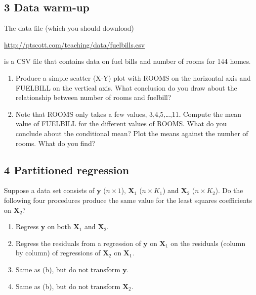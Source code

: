 \documentclass[11pt]{article}
\begin{document}
\subsection*{3 Data warm-up}

The data file (which you should download) 

\href{http://ptscott.com/teaching/data/fuelbills.csv}{http://ptscott.com/teaching/data/fuelbills.csv }

is a CSV file that contains data on fuel bills and number of rooms for 144 homes. 

\begin{enumerate}[label=\alph*)]
\item Produce a simple scatter (X-Y) plot with ROOMS on the horizontal axis
and FUELBILL on the vertical axis. What conclusion do you draw about
the relationship between number of rooms and fuelbill? 

\item Note that ROOMS only takes a few values, 3,4,5,\dots ,11. Compute
the mean value of FUELBILL for the different values of ROOMS. What
do you conclude about the conditional mean? Plot the means against
the number of rooms. What do you find?
\end{enumerate}



\subsection*{4 Partitioned regression}
Suppose a data set consists of $\boldsymbol{y}$ ($n \times 1$), $\boldsymbol{X}_{1}$ ($n \times K_{1}$)
and $\boldsymbol{X}_{2}$  ($n \times K_{2}$). Do the following four procedures
produce the same value for the least squares coefficients on $\boldsymbol{X}_{2}$?
\begin{enumerate}[label=\alph*)]
\item Regress $\boldsymbol{y}$ on both $\boldsymbol{X}_{1}$ and $\boldsymbol{X}_{2}$. 
\item Regress the residuals from a regression of $\boldsymbol{y}$ on $\boldsymbol{X}_{1}$ on the
residuals (column by column) of regressions of $\boldsymbol{X}_{2}$ on $\boldsymbol{X}_{1}$. 
\item Same as (b), but do not transform $\boldsymbol{y}$. 
\item Same as (b), but do not transform $\boldsymbol{X}_{2}$.
\end{enumerate}
\end{document}
